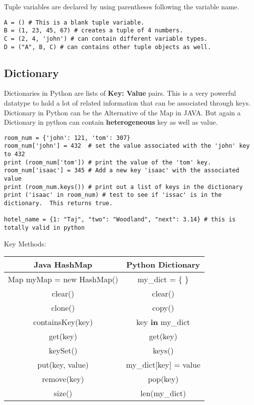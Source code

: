 \documentclass[a4paper,9pt]{extarticle}
\begin{document}
\begin{multicols*}{2}
Tuple variables are declared by using parentheses \boxed{( )} following the variable name.

\begin{lstlisting}
A = () # This is a blank tuple variable.
B = (1, 23, 45, 67) # creates a tuple of 4 numbers.
C = (2, 4, 'john') # can contain different variable types.
D = ("A", B, C) # can contains other tuple objects as well.
\end{lstlisting}

\subsection{Dictionary}
Dictionaries in Python are lists of \textbf{Key: Value} pairs. This is a very powerful datatype to hold a lot of related information that can be associated through keys.
Dictionary in Python can be the Alternative of the Map in JAVA. But again a Dictionary in python can contain \textbf{heterogeneous} key as well as value.

\begin{lstlisting}
room_num = {'john': 121, 'tom': 307}
room_num['john'] = 432  # set the value associated with the 'john' key to 432
print (room_num['tom']) # print the value of the 'tom' key.
room_num['isaac'] = 345 # Add a new key 'isaac' with the associated value
print (room_num.keys()) # print out a list of keys in the dictionary
print ('isaac' in room_num) # test to see if 'issac' is in the dictionary.  This returns true.

hotel_name = {1: "Taj", "two": "Woodland", "next": 3.14} # this is totally valid in python
\end{lstlisting}

Key Methods:
\begin{center}
 \begin{tabular}{||c | c||}
 \hline
 Java HashMap & Python Dictionary\\ [1ex]
 \hline\hline
 Map myMap = new HashMap() & my\_dict = \{ \}\\
 \hline
 clear() & clear()\\
 \hline
 clone() & copy()\\
 \hline
 containsKey(key) & key \textbf{in} my\_dict\\
 \hline
 get(key) & get(key)\\
 \hline
 keySet() & keys()\\
 \hline
 put(key, value) & my\_dict[key] = value\\
 \hline
 remove(key) & pop(key)\\
 \hline
 size() & len(my\_dict)\\
 \hline
\end{tabular}
\end{center}


\end{multicols*}
\end{document}
